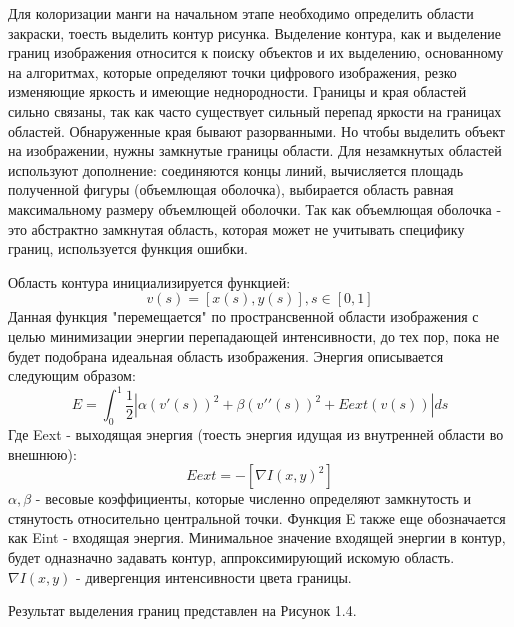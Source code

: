  Для колоризации манги на начальном этапе необходимо
определить области закраски, тоесть выделить контур рисунка. Выделение контура, как и выделение границ изображения относится к поиску объектов и их выделению, основанному на алгоритмах, которые определяют точки цифрового изображения, резко
изменяющие яркость и имеющие неднородности.  Границы и края областей сильно связаны, так как часто существует сильный перепад яркости на границах областей. Обнаруженные края бывают разорванными. Но чтобы выделить объект на изображении, нужны замкнутые границы области. Для незамкнутых областей используют дополнение: соединяются концы линий, вычисляется площадь полученной фигуры (объемлющая оболочка), выбирается область равная максимальному размеру объемлющей оболочки. Так как объемлющая оболочка - это абстрактно замкнутая область, которая может не учитывать специфику границ, используется функция ошибки. 

 Область контура инициализируется функцией:
\begin{equation}
v(s) = [x(s), y(s)], s \in [0, 1]
\end{equation} 
Данная функция "перемещается" по пространсвенной области изображения с целью минимизации энергии перепадающей интенсивности, до тех пор, пока не будет подобрана идеальная область изображения. 
Энергия описывается следующим образом:
\begin{equation}
E = \int_{0}^{1} \frac{1}{2} |\alpha(v\prime(s))^2 + \beta(v\prime\prime(s))^2 + Eext(v(s))|ds
\end{equation}
Где Eext - выходящая энергия (тоесть энергия идущая из внутренней области во внешнюю):
\begin{equation}
Eext = -[\nabla I(x, y)^2]
\end{equation}
$\alpha, \beta$ - весовые коэффициенты, которые численно определяют замкнутость и стянутость относительно центральной точки.
Функция E также еще обозначается как Eint - входящая энергия. Минимальное значение входящей энергии в контур, будет одназначно задавать контур, аппроксимирующий искомую область.
$\nabla I(x, y)$ - дивергенция интенсивности цвета границы.

Результат выделения границ представлен на Рисунок 1.4.

\begin{figure}[ht!]
\end{figure}

